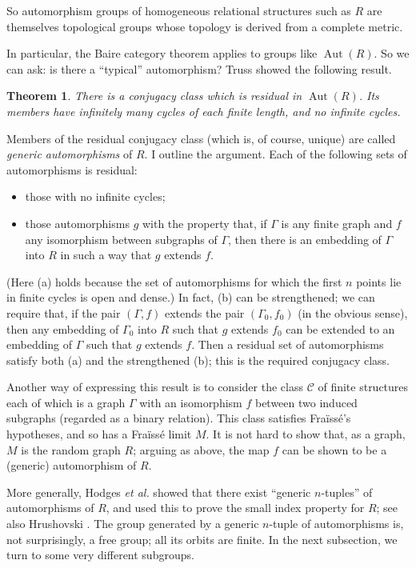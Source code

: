 \documentclass[12pt]{article}
\newtheorem{theorem}{Theorem}
\DeclareMathOperator{\Aut}{Aut}
\begin{document}
So automorphism groups of homogeneous relational structures such as $R$ are
themselves topological groups whose topology is derived from a complete metric.

In particular, the Baire category theorem applies to groups like $\Aut(R)$.
So we can ask: is there a
``typical'' automorphism? Truss \cite{ch32:bib53} showed the
following result.

\begin{theorem}\label{ch32:them9.2}
There is a conjugacy class which is residual in
$\Aut(R)$. Its members have infinitely many cycles of each
finite length, and no infinite cycles.
\end{theorem}

Members of the residual conjugacy class (which is, of course,
unique) are called \emph{generic automorphisms} of $R$. I outline
the argument. Each of the following sets of automorphisms is
residual:
\begin{itemize}
\item[(a)] those with no infinite cycles;
\item[(b)] those automorphisms $g$ with the property that, 
if $\Gamma$ is any finite graph and $f$
any isomorphism between subgraphs of $\Gamma$, then there is an
embedding of $\Gamma$ into $R$ in such a way that $g$ extends $f$.
\end{itemize}
(Here (a) holds because the set of automorphisms for which the first
$n$ points lie in finite cycles is open and dense.) In fact, (b) can
be strengthened; we can require that, if the pair $(\Gamma, f)$
extends the pair $(\Gamma_0, f_0)$ (in the obvious sense), then any
embedding of $\Gamma_0$ into $R$ such that $g$ extends $f_0$ can be
extended to an embedding of $\Gamma$ such that $g$ extends $f$. Then
a residual set of automorphisms satisfy both (a) and the
strengthened (b); this is the required conjugacy class.

Another way of expressing this result is to consider the class
$\mathcal{C}$ of finite structures each of which is a graph $\Gamma$
with an isomorphism $f$ between two induced subgraphs (regarded as a
binary relation). This class satisfies Fra\"{i}ss\'{e}'s hypotheses,
and so has a Fra\"{i}ss\'{e} limit $M$. It is not hard to show that,
as a graph, $M$ is the random graph $R$; arguing as above, the map
$f$ can be shown to be a (generic) automorphism of $R$.

More generally, Hodges \textit{et al.} \cite{ch32:bib29} showed that
there exist ``generic $n$-tuples'' of automorphisms of $R$, and used
this to prove the small index property for $R$; see also Hrushovski
\cite{ch32:bib30}. The group generated by a generic $n$-tuple of
automorphisms is, not surprisingly, a free group; all its orbits are
finite. In the next subsection, we turn to some very different subgroups.
\end{document}
